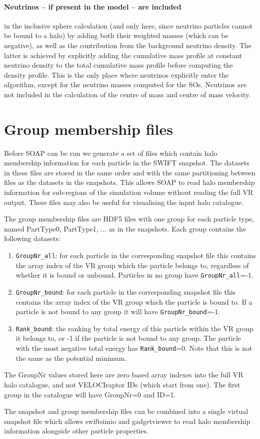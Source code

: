 \documentclass{article}
\begin{document}
\paragraph{Neutrinos -- if present in the model -- are included} in the inclusive sphere calculation (and only 
here, since neutrino particles cannot be bound to a halo) by adding both their weighted masses (which can be 
negative), as well as the contribution from the background neutrino density. The latter is achieved by 
explicitly adding the cumulative mass profile at constant neutrino density to the total cumulative mass 
profile before computing the density profile. This is the only place where neutrinos explicitly enter the 
algorithm, except for the neutrino masses computed for the SOs. Neutrinos are not included in the calculation 
of the centre of mass and centre of mass velocity.

\section{Group membership files}

Before SOAP can be run we generate a set of files which contain halo
membership information for each particle in the SWIFT snapshot. The
datasets in these files are stored in the same order and with the same
partitioning between files as the datasets in the snapshots. This
allows SOAP to read halo membership information for sub-regions of the
simulation volume without reading the full VR output. These files may
also be useful for visualising the input halo catalogue.

The group membership files are HDF5 files with one group for each
particle type, named PartType0, PartType1, ... as in the
snapshots. Each group contains the following datasets:

\begin{enumerate}
\item \verb|GroupNr_all|: for each particle in the corresponding snapshot
  file this contains the array index of the VR group which the
  particle belongs to, regardless of whether it is bound or
  unbound. Particles in no group have \verb|GroupNr_all|=-1.
\item \verb|GroupNr_bound|: for each particle in the corresponding snapshot
  file this contains the array index of the VR group which the
  particle is bound to. If a particle is not bound to any group it
  will have \verb|GroupNr_bound|=-1.
\item \verb|Rank_bound|: the ranking by total energy of this particle within
  the VR group it belongs to, or -1 if the particle is not bound to
  any group. The particle with the most negative total energy has
  \verb|Rank_bound|=0. Note that this is not the same as the potential
  minimum.
\end{enumerate}

The GroupNr values stored here are zero based array indexes into the
full VR halo catalogue, and not VELOCIraptor IDs (which start from
one). The first group in the catalogue will have GroupNr=0 and ID=1.

The snapshot and group membership files can be combined into a single
virtual snapshot file which allows swiftsimio and gadgetviewer to read
halo membership information alongside other particle properties.
\end{document}
